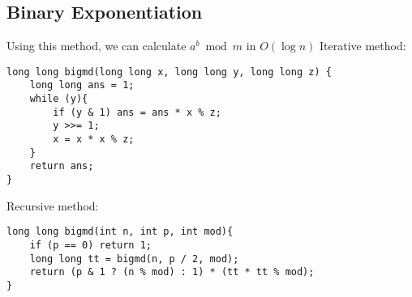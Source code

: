\subsection{Binary Exponentiation}
Using this method, we can calculate $a^b \bmod{m}$ in $O(\log{n})$
\linebreak
\linebreak
Iterative method:
\begin{lstlisting}
long long bigmd(long long x, long long y, long long z) {
    long long ans = 1;
    while (y){
        if (y & 1) ans = ans * x % z;
        y >>= 1;
        x = x * x % z;
    }
    return ans;
}
\end{lstlisting}

Recursive method:

\begin{lstlisting}
long long bigmd(int n, int p, int mod){
    if (p == 0) return 1;
    long long tt = bigmd(n, p / 2, mod);
    return (p & 1 ? (n % mod) : 1) * (tt * tt % mod);
}
\end{lstlisting}